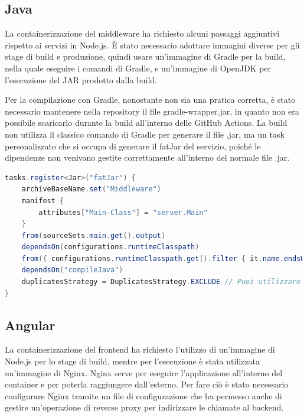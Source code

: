 \subsection{Java}

La containerizzazione del middleware ha richiesto alcuni passaggi aggiuntivi rispetto ai servizi in Node.js.
È stato necessario adottare immagini diverse per gli stage di build e produzione, quindi usare un'immagine di Gradle per la build, nella quale eseguire i comandi di Gradle, e un'immagine di 
OpenJDK per l'esecuzione del JAR prodotto dalla build.

Per la compilazione con Gradle, nonostante non sia una pratica corretta, è stato necessario mantenere nella repository il file gradle-wrapper.jar, in quanto non era possibile scaricarlo durante la build all'interno delle GitHub Actions.
La build non utilizza il classico comando di Gradle per generare il file .jar, ma un task personalizzato che si occupa di generare il fatJar del servizio, poiché le dipendenze non venivano gestite correttamente all'interno del normale file .jar.

\begin{lstlisting}[language=Java, caption={Task del fatJar da includere nel container}, label=list:gradle_fatJar]
tasks.register<Jar>("fatJar") {
    archiveBaseName.set("Middleware")
    manifest {
        attributes["Main-Class"] = "server.Main"
    }
    from(sourceSets.main.get().output)
    dependsOn(configurations.runtimeClasspath)
    from({ configurations.runtimeClasspath.get().filter { it.name.endsWith("jar") }.map { zipTree(it) } })
    dependsOn("compileJava")
    duplicatesStrategy = DuplicatesStrategy.EXCLUDE // Puoi utilizzare altre strategie come DuplicatesStrategy.WARN per avvisare ma non fermare la build
}
\end{lstlisting}

\subsection{Angular}

La containerizzazione del frontend ha richiesto l'utilizzo di un'immagine di Node.js per lo stage di build, mentre per l'esecuzione è stata utilizzata un'immagine di Nginx.
Nginx serve per eseguire l'applicazione all'interno del container e per poterla raggiungere dall'esterno. Per fare ciò è stato necessario configurare Nginx tramite un file di configurazione che ha permesso anche di gestire un'operazione di reverse proxy per indirizzare le chiamate al backend.

